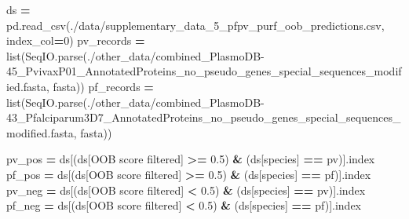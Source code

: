 \documentclass[
  11pt,
  oneside]{book}
\newenvironment{Shaded}{\begin{snugshade}}{\end{snugshade}}
\newcommand{\BuiltInTok}[1]{#1}
\newcommand{\DecValTok}[1]{\textcolor[rgb]{0.00,0.00,0.81}{#1}}
\newcommand{\FloatTok}[1]{\textcolor[rgb]{0.00,0.00,0.81}{#1}}
\newcommand{\NormalTok}[1]{#1}
\newcommand{\OperatorTok}[1]{\textcolor[rgb]{0.81,0.36,0.00}{\textbf{#1}}}
\newcommand{\StringTok}[1]{\textcolor[rgb]{0.31,0.60,0.02}{#1}}
\begin{document}
\begin{Shaded}
\begin{Highlighting}[]
\NormalTok{ds }\OperatorTok{=}\NormalTok{ pd.read\_csv(}\StringTok{\textquotesingle{}./data/supplementary\_data\_5\_pfpv\_purf\_oob\_predictions.csv\textquotesingle{}}\NormalTok{, index\_col}\OperatorTok{=}\DecValTok{0}\NormalTok{)}
\NormalTok{pv\_records }\OperatorTok{=} \BuiltInTok{list}\NormalTok{(SeqIO.parse(}\StringTok{\textquotesingle{}./other\_data/combined\_PlasmoDB{-}45\_PvivaxP01\_AnnotatedProteins\_no\_pseudo\_genes\_special\_sequences\_modified.fasta\textquotesingle{}}\NormalTok{, }\StringTok{\textquotesingle{}fasta\textquotesingle{}}\NormalTok{))}
\NormalTok{pf\_records }\OperatorTok{=} \BuiltInTok{list}\NormalTok{(SeqIO.parse(}\StringTok{\textquotesingle{}./other\_data/combined\_PlasmoDB{-}43\_Pfalciparum3D7\_AnnotatedProteins\_no\_pseudo\_genes\_special\_sequences\_modified.fasta\textquotesingle{}}\NormalTok{, }\StringTok{\textquotesingle{}fasta\textquotesingle{}}\NormalTok{))}

\NormalTok{pv\_pos }\OperatorTok{=}\NormalTok{ ds[(ds[}\StringTok{\textquotesingle{}OOB score filtered\textquotesingle{}}\NormalTok{] }\OperatorTok{\textgreater{}=} \FloatTok{0.5}\NormalTok{) }\OperatorTok{\&}\NormalTok{ (ds[}\StringTok{\textquotesingle{}species\textquotesingle{}}\NormalTok{] }\OperatorTok{==} \StringTok{\textquotesingle{}pv\textquotesingle{}}\NormalTok{)].index}
\NormalTok{pf\_pos }\OperatorTok{=}\NormalTok{ ds[(ds[}\StringTok{\textquotesingle{}OOB score filtered\textquotesingle{}}\NormalTok{] }\OperatorTok{\textgreater{}=} \FloatTok{0.5}\NormalTok{) }\OperatorTok{\&}\NormalTok{ (ds[}\StringTok{\textquotesingle{}species\textquotesingle{}}\NormalTok{] }\OperatorTok{==} \StringTok{\textquotesingle{}pf\textquotesingle{}}\NormalTok{)].index}
\NormalTok{pv\_neg }\OperatorTok{=}\NormalTok{ ds[(ds[}\StringTok{\textquotesingle{}OOB score filtered\textquotesingle{}}\NormalTok{] }\OperatorTok{\textless{}} \FloatTok{0.5}\NormalTok{) }\OperatorTok{\&}\NormalTok{ (ds[}\StringTok{\textquotesingle{}species\textquotesingle{}}\NormalTok{] }\OperatorTok{==} \StringTok{\textquotesingle{}pv\textquotesingle{}}\NormalTok{)].index}
\NormalTok{pf\_neg }\OperatorTok{=}\NormalTok{ ds[(ds[}\StringTok{\textquotesingle{}OOB score filtered\textquotesingle{}}\NormalTok{] }\OperatorTok{\textless{}} \FloatTok{0.5}\NormalTok{) }\OperatorTok{\&}\NormalTok{ (ds[}\StringTok{\textquotesingle{}species\textquotesingle{}}\NormalTok{] }\OperatorTok{==} \StringTok{\textquotesingle{}pf\textquotesingle{}}\NormalTok{)].index}


\end{Highlighting}
\end{Shaded}
\end{document}
